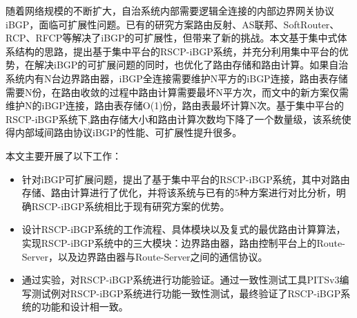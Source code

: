 \begin{cabstract}
  随着网络规模的不断扩大，自治系统内部需要逻辑全连接的内部边界网关协议iBGP，面临可扩展性问题。已有的研究方案路由反射、AS联邦、SoftRouter、RCP、RFCP等解决了iBGP的可扩展性，但带来了新的挑战。本文基于集中式体系结构的思路，提出基于集中平台的RSCP-iBGP系统，并充分利用集中平台的优势，在解决iBGP的可扩展问题的同时，也优化了路由存储和路由计算。如果自治系统内有N台边界路由器，iBGP全连接需要维护N平方的iBGP连接，路由表存储需要N份，在路由收敛的过程中路由计算需要最坏N平方次，而文中的新方案仅需维护N的iBGP连接，路由表存储O(1)份，路由表最坏计算N次。基于集中平台的RSCP-iBGP系统下,路由存储大小和路由计算次数均下降了一个数量级，该系统使得内部域间路由协议iBGP的性能、可扩展性提升很多。

  本文主要开展了以下工作：
  \begin{itemize}
    \item 针对iBGP可扩展问题，提出了基于集中平台的RSCP-iBGP系统，其中对路由存储、路由计算进行了优化，并将该系统与已有的5种方案进行对比分析，明确RSCP-iBGP系统相比于现有研究方案的优势。
    \item 设计RSCP-iBGP系统的工作流程、具体模块以及复式的最优路由计算算法，实现RSCP-iBGP系统中的三大模块：边界路由器，路由控制平台上的Route-Server，以及边界路由器与Route-Server之间的通信协议。
    \item 通过实验，对RSCP-iBGP系统进行功能验证。通过一致性测试工具PITSv3编写测试例对RSCP-iBGP系统进行功能一致性测试，最终验证了RSCP-iBGP系统的功能和设计相一致。
  \end{itemize}

\end{cabstract}


